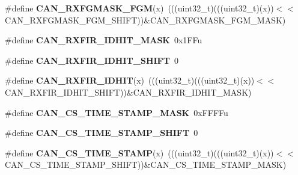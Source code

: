\begin{DoxyCompactItemize}
\item 
\#define {\bfseries C\+A\+N\+\_\+\+R\+X\+F\+G\+M\+A\+S\+K\+\_\+\+F\+GM}(x)~(((uint32\+\_\+t)(((uint32\+\_\+t)(x))$<$$<$C\+A\+N\+\_\+\+R\+X\+F\+G\+M\+A\+S\+K\+\_\+\+F\+G\+M\+\_\+\+S\+H\+I\+FT))\&C\+A\+N\+\_\+\+R\+X\+F\+G\+M\+A\+S\+K\+\_\+\+F\+G\+M\+\_\+\+M\+A\+SK)\hypertarget{group__CAN__Register__Masks_ga15b1e73fac26a60dd1247901ed012e02}{}\label{group__CAN__Register__Masks_ga15b1e73fac26a60dd1247901ed012e02}

\item 
\#define {\bfseries C\+A\+N\+\_\+\+R\+X\+F\+I\+R\+\_\+\+I\+D\+H\+I\+T\+\_\+\+M\+A\+SK}~0x1\+F\+Fu\hypertarget{group__CAN__Register__Masks_ga097ddfd77b23ddd23341d8ea269ce64b}{}\label{group__CAN__Register__Masks_ga097ddfd77b23ddd23341d8ea269ce64b}

\item 
\#define {\bfseries C\+A\+N\+\_\+\+R\+X\+F\+I\+R\+\_\+\+I\+D\+H\+I\+T\+\_\+\+S\+H\+I\+FT}~0\hypertarget{group__CAN__Register__Masks_ga6a1b5e43de75851c0bdc5690c1715a14}{}\label{group__CAN__Register__Masks_ga6a1b5e43de75851c0bdc5690c1715a14}

\item 
\#define {\bfseries C\+A\+N\+\_\+\+R\+X\+F\+I\+R\+\_\+\+I\+D\+H\+IT}(x)~(((uint32\+\_\+t)(((uint32\+\_\+t)(x))$<$$<$C\+A\+N\+\_\+\+R\+X\+F\+I\+R\+\_\+\+I\+D\+H\+I\+T\+\_\+\+S\+H\+I\+FT))\&C\+A\+N\+\_\+\+R\+X\+F\+I\+R\+\_\+\+I\+D\+H\+I\+T\+\_\+\+M\+A\+SK)\hypertarget{group__CAN__Register__Masks_ga8b2cdf4be2403ad67220d43309a7ab91}{}\label{group__CAN__Register__Masks_ga8b2cdf4be2403ad67220d43309a7ab91}

\item 
\#define {\bfseries C\+A\+N\+\_\+\+C\+S\+\_\+\+T\+I\+M\+E\+\_\+\+S\+T\+A\+M\+P\+\_\+\+M\+A\+SK}~0x\+F\+F\+F\+Fu\hypertarget{group__CAN__Register__Masks_ga70e77ee06fb6bf69b46020d1e3b91819}{}\label{group__CAN__Register__Masks_ga70e77ee06fb6bf69b46020d1e3b91819}

\item 
\#define {\bfseries C\+A\+N\+\_\+\+C\+S\+\_\+\+T\+I\+M\+E\+\_\+\+S\+T\+A\+M\+P\+\_\+\+S\+H\+I\+FT}~0\hypertarget{group__CAN__Register__Masks_gaa9e77f6476678316f4bedf1b02afe0d0}{}\label{group__CAN__Register__Masks_gaa9e77f6476678316f4bedf1b02afe0d0}

\item 
\#define {\bfseries C\+A\+N\+\_\+\+C\+S\+\_\+\+T\+I\+M\+E\+\_\+\+S\+T\+A\+MP}(x)~(((uint32\+\_\+t)(((uint32\+\_\+t)(x))$<$$<$C\+A\+N\+\_\+\+C\+S\+\_\+\+T\+I\+M\+E\+\_\+\+S\+T\+A\+M\+P\+\_\+\+S\+H\+I\+FT))\&C\+A\+N\+\_\+\+C\+S\+\_\+\+T\+I\+M\+E\+\_\+\+S\+T\+A\+M\+P\+\_\+\+M\+A\+SK)\hypertarget{group__CAN__Register__Masks_gadd5ca585a16641a7a0046706f91185ce}{}\label{group__CAN__Register__Masks_gadd5ca585a16641a7a0046706f91185ce}


\end{DoxyCompactItemize}
